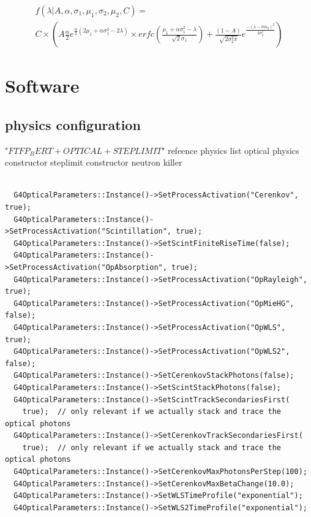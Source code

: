 \documentclass{article}
\begin{document}
\begin{multline}
  f (\lambda | A, \alpha, \sigma_1 , \mu_{1} , \sigma_{2} , \mu_{2}, C ) =\\
  C \times \left(
  A \frac{\alpha}{2} e^{ \frac{\alpha}{2} ( 2 \mu_{1} +\alpha \sigma_{1}^{2} - 2 \lambda) }
  \times  erfc\left( \frac{\mu_{1} + \alpha \sigma_{1}^{2} - \lambda}{\sqrt{2} \sigma_{1}} \right)
  + \frac{(1 - A)}{\sqrt{2 \sigma_{2}^{2}\pi} }  e^{\frac{-(\lambda -mu_{2})^{2}}{2 \sigma_{2}^{2}}}
  \right)
  \label{equ:wls}
\end{multline}

\section{Software}
\subsection{physics configuration}

"$FTFP_BERT+OPTICAL+STEPLIMIT$"
refeence physics list
optical physics constructor
steplimit constructor
neutron killer 
\begin{verbatim}

  G4OpticalParameters::Instance()->SetProcessActivation("Cerenkov", true);
  G4OpticalParameters::Instance()->SetProcessActivation("Scintillation", true);
  G4OpticalParameters::Instance()->SetScintFiniteRiseTime(false);
  G4OpticalParameters::Instance()->SetProcessActivation("OpAbsorption", true);
  G4OpticalParameters::Instance()->SetProcessActivation("OpRayleigh", true);
  G4OpticalParameters::Instance()->SetProcessActivation("OpMieHG", false);
  G4OpticalParameters::Instance()->SetProcessActivation("OpWLS", true);
  G4OpticalParameters::Instance()->SetProcessActivation("OpWLS2", false);
  G4OpticalParameters::Instance()->SetCerenkovStackPhotons(false);
  G4OpticalParameters::Instance()->SetScintStackPhotons(false);
  G4OpticalParameters::Instance()->SetScintTrackSecondariesFirst(
    true);  // only relevant if we actually stack and trace the optical photons
  G4OpticalParameters::Instance()->SetCerenkovTrackSecondariesFirst(
    true);  // only relevant if we actually stack and trace the optical photons
  G4OpticalParameters::Instance()->SetCerenkovMaxPhotonsPerStep(100);
  G4OpticalParameters::Instance()->SetCerenkovMaxBetaChange(10.0);
  G4OpticalParameters::Instance()->SetWLSTimeProfile("exponential");
  G4OpticalParameters::Instance()->SetWLS2TimeProfile("exponential");

\end{verbatim}
\end{document}

